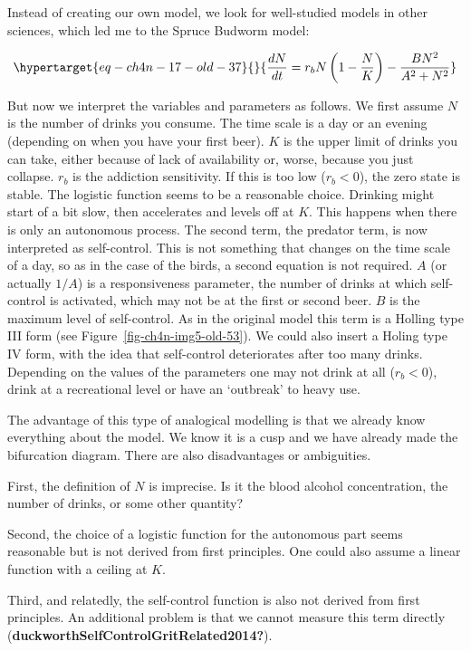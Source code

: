 \documentclass[
  a4paper,
  DIV=11,
  numbers=noendperiod,
  oneside]{scrreprt}
\begin{document}
Instead of creating our own model, we look for well-studied models in
other sciences, which led me to the Spruce Budworm model:

\begin{equation}\protect\hypertarget{eq-ch4n-17-old-37}{}{
\frac{dN}{dt} = r_{b}N\left( 1 - \frac{N}{K} \right) - \frac{BN^{2}}{A^{2} + N^{2}}
}\label{eq-ch4n-17-old-37}\end{equation}

But now we interpret the variables and parameters as follows. We first
assume \(N\) is the number of drinks you consume. The time scale is a
day or an evening (depending on when you have your first beer). \(K\) is
the upper limit of drinks you can take, either because of lack of
availability or, worse, because you just collapse. \(r_{b}\) is the
addiction sensitivity. If this is too low (\(r_{b} < 0\)), the zero
state is stable. The logistic function seems to be a reasonable choice.
Drinking might start of a bit slow, then accelerates and levels off at
\(K\). This happens when there is only an autonomous process. The second
term, the predator term, is now interpreted as self-control. This is not
something that changes on the time scale of a day, so as in the case of
the birds, a second equation is not required. \(A\) (or actually
\(1/A\)) is a responsiveness parameter, the number of drinks at which
self-control is activated, which may not be at the first or second beer.
\(B\) is the maximum level of self-control. As in the original model
this term is a Holling type III form (see
Figure~\ref{fig-ch4n-img5-old-53}). We could also insert a Holing type
IV form, with the idea that self-control deteriorates after too many
drinks. Depending on the values of the parameters one may not drink at
all (\(r_{b} < 0\)), drink at a recreational level or have an `outbreak'
to heavy use.

The advantage of this type of analogical modelling is that we already
know everything about the model. We know it is a cusp and we have
already made the bifurcation diagram. There are also disadvantages or
ambiguities.

First, the definition of \(N\) is imprecise. Is it the blood alcohol
concentration, the number of drinks, or some other quantity?

Second, the choice of a logistic function for the autonomous part seems
reasonable but is not derived from first principles. One could also
assume a linear function with a ceiling at \(K\).

Third, and relatedly, the self-control function is also not derived from
first principles. An additional problem is that we cannot measure this
term directly (\textbf{duckworthSelfControlGritRelated2014?}).
\end{document}
